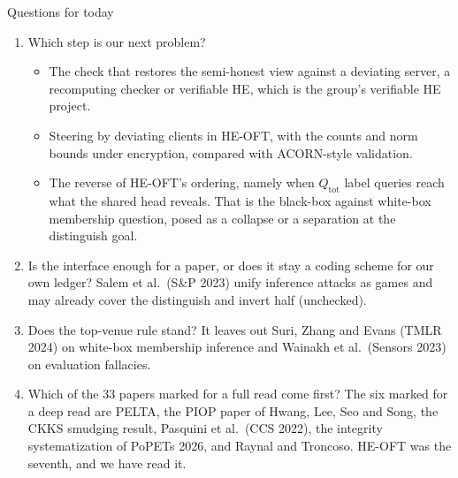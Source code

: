 \documentclass[aspectratio=169,10pt]{beamer}
\newcommand{\Qtot}{Q_{\mathrm{tot}}}
\begin{document}
\begin{frame}{Questions for today}
  \small
  \begin{enumerate}
    \item Which step is our next problem?
      \begin{itemize}
        \item The check that restores the semi-honest view against a deviating server, a recomputing checker or verifiable HE, which is the group's verifiable HE project.
        \item Steering by deviating clients in HE-OFT, with the counts and norm bounds under encryption, compared with ACORN-style validation.
        \item The reverse of HE-OFT's ordering, namely when $\Qtot$ label queries reach what the shared head reveals. That is the black-box against white-box membership question, posed as a collapse or a separation at the distinguish goal.
      \end{itemize}
    \item Is the interface enough for a paper, or does it stay a coding scheme for our own ledger? Salem et al.\ (S\&P 2023) unify inference attacks as games and may already cover the distinguish and invert half (unchecked).
    \item Does the top-venue rule stand? It leaves out Suri, Zhang and Evans (TMLR 2024) on white-box membership inference and Wainakh et al.\ (Sensors 2023) on evaluation fallacies.
    \item Which of the 33 papers marked for a full read come first? The six marked for a deep read are PELTA, the PIOP paper of Hwang, Lee, Seo and Song, the CKKS smudging result, Pasquini et al.\ (CCS 2022), the integrity systematization of PoPETs 2026, and Raynal and Troncoso. HE-OFT was the seventh, and we have read it.
  \end{enumerate}
\end{frame}
\end{document}
